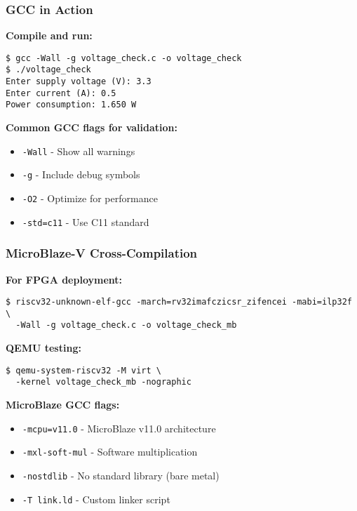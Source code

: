 \documentclass{beamer}
\begin{document}
\begin{frame}[fragile]
\frametitle{GCC in Action}
\textbf{Compile and run:}
\begin{verbatim}
$ gcc -Wall -g voltage_check.c -o voltage_check
$ ./voltage_check
Enter supply voltage (V): 3.3
Enter current (A): 0.5
Power consumption: 1.650 W
\end{verbatim}

\textbf{Common GCC flags for validation:}
\begin{itemize}
    \item \texttt{-Wall} - Show all warnings
    \item \texttt{-g} - Include debug symbols
    \item \texttt{-O2} - Optimize for performance
    \item \texttt{-std=c11} - Use C11 standard
\end{itemize}
\end{frame}

\begin{frame}[fragile]
\frametitle{MicroBlaze-V Cross-Compilation}
\textbf{For FPGA deployment:}
\begin{verbatim}
$ riscv32-unknown-elf-gcc -march=rv32imafczicsr_zifencei -mabi=ilp32f \
  -Wall -g voltage_check.c -o voltage_check_mb
\end{verbatim}

\textbf{QEMU testing:}
\begin{verbatim}
$ qemu-system-riscv32 -M virt \
  -kernel voltage_check_mb -nographic
\end{verbatim}

\textbf{MicroBlaze GCC flags:}
\begin{itemize}
    \item \texttt{-mcpu=v11.0} - MicroBlaze v11.0 architecture
    \item \texttt{-mxl-soft-mul} - Software multiplication
    \item \texttt{-nostdlib} - No standard library (bare metal)
    \item \texttt{-T link.ld} - Custom linker script
\end{itemize}
\end{frame}
\end{document}
